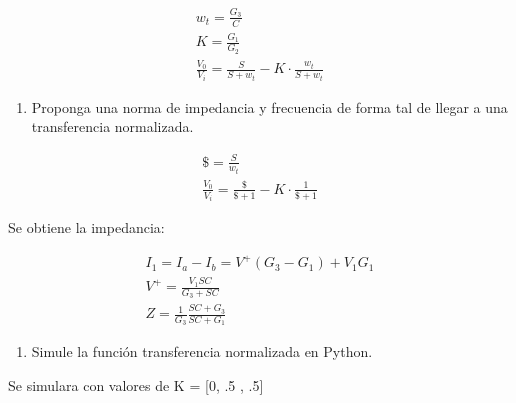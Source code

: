 \documentclass[letterpaper,10pt,english]{sphinxmanual}
\begin{document}
\sphinxAtStartPar
\begin{equation}
\begin{gathered}
w_t=\frac{G_3}{C} \\
K=\frac{G_1}{G_2} \\
\frac{V_0}{V_i}=\frac{S}{S+w_t}-K \cdot \frac{w_t}{S+w_t}
\end{gathered}
\end{equation}
\begin{enumerate}
%
\setcounter{enumi}{1}
\item {} 
\sphinxAtStartPar
Proponga una norma de impedancia y frecuencia de forma tal de llegar a una transferencia normalizada.

\end{enumerate}

\sphinxAtStartPar
\begin{equation}
\begin{gathered}
\$=\frac{S}{w_t} \\
\frac{V_0}{V_i}=\frac{\$}{\$+1}-K \cdot \frac{1}{\$+1}
\end{gathered}
\end{equation}

\sphinxAtStartPar
Se obtiene la impedancia:

\sphinxAtStartPar
\begin{equation}
\begin{gathered}
I_1=I_a-I_b=V^{+}\left(G_3-G_1\right)+V_1 G_1 \\
V^{+}=\frac{V_1 S C}{G_3+S C} \\
Z=\frac{1}{G_3} \frac{S C+G_3}{S C+G_1}
\end{gathered}
\end{equation}
\begin{enumerate}
%
\setcounter{enumi}{2}
\item {} 
\sphinxAtStartPar
Simule la función transferencia normalizada en Python.

\end{enumerate}

\sphinxAtStartPar
Se simulara con valores de K = {[}0, .5 , \sphinxhyphen{}.5{]}
\end{document}
